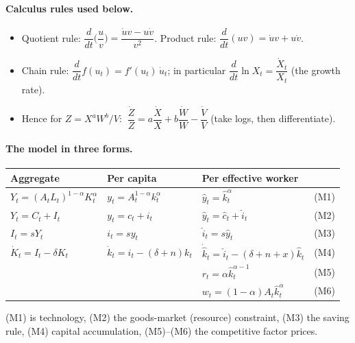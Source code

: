 \paragraph{Calculus rules used below.}
\begin{itemize}
  \item Quotient rule: $\dfrac{d}{dt}\Big(\dfrac{u}{v}\Big) = \dfrac{\dot u v - u\dot v}{v^2}$. \quad Product rule: $\dfrac{d}{dt}(uv) = \dot u v + u\dot v$.
  \item Chain rule: $\dfrac{d}{dt}f(u_t) = f'(u_t)\,\dot u_t$; in particular $\dfrac{d}{dt}\ln X_t = \dfrac{\dot X_t}{X_t}$ (the growth rate).
  \item Hence for $Z = X^aW^b/V$: $\ \dfrac{\dot Z}{Z} = a\dfrac{\dot X}{X}+b\dfrac{\dot W}{W}-\dfrac{\dot V}{V}$ (take logs, then differentiate).
\end{itemize}

\paragraph{The model in three forms.}
\begin{center}
\renewcommand{\arraystretch}{1.35}
\begin{tabular}{lllc}
\textbf{Aggregate} & \textbf{Per capita} & \textbf{Per effective worker} & \\ \hline
$Y_t=(A_tL_t)^{1-\alpha}K_t^{\alpha}$ & $y_t=A_t^{1-\alpha}k_t^{\alpha}$ & $\hat y_t=\hat k_t^{\alpha}$ & (M1)\\
$Y_t=C_t+I_t$ & $y_t=c_t+i_t$ & $\hat y_t=\hat c_t+\hat i_t$ & (M2)\\
$I_t=sY_t$ & $i_t=sy_t$ & $\hat i_t=s\hat y_t$ & (M3)\\
$\dot K_t=I_t-\delta K_t$ & $\dot k_t=i_t-(\delta+n)k_t$ & $\dot{\hat k}_t=\hat i_t-(\delta+n+x)\hat k_t$ & (M4)\\
 & & $r_t=\alpha\hat k_t^{\alpha-1}$ & (M5)\\
 & & $w_t=(1-\alpha)A_t\hat k_t^{\alpha}$ & (M6)
\end{tabular}
\end{center}
(M1) is technology, (M2) the goods-market (resource) constraint, (M3) the saving rule, (M4) capital accumulation, (M5)--(M6) the competitive factor prices.

